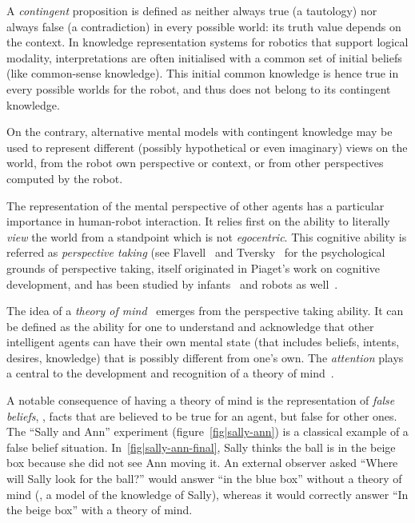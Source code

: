 A \emph{contingent} proposition is defined as neither always true (a tautology)
nor always false (a contradiction) in every possible world: its truth value
depends on the context. In knowledge representation systems for robotics that
support logical modality, interpretations are often initialised with a common
set of initial beliefs (like common-sense knowledge). This initial common
knowledge is hence true in every possible worlds for the robot, and thus does
not belong to its contingent knowledge.

On the contrary, alternative mental models with contingent knowledge may be
used to represent different (possibly hypothetical or even imaginary) views on
the world, from the robot own perspective or context, or from other
perspectives computed by the robot.

The representation of the mental perspective of other agents has a particular
importance in human-robot interaction. It relies first on the ability to
literally \emph{view} the world from a standpoint which is not
\emph{egocentric}. This cognitive ability is referred as \emph{perspective
taking} (see Flavell~\cite{Flavell1992} and Tversky~\cite{Tversky1999} for the
psychological grounds of perspective taking, itself originated in Piaget's work
on cognitive development, and has been studied by infants~\cite{Moll2006} and
robots as well~\cite{Trafton2005, Breazeal2006, Ros2010}.

The idea of a \emph{theory of mind}~\cite{Premack1978} emerges from the
perspective taking ability. It can be defined as the ability for one to
understand and acknowledge that other intelligent agents can have their own
mental state (that includes beliefs, intents, desires, knowledge) that is
possibly different from one's own. The \emph{attention} plays a central to the
development and recognition of a theory of mind~\cite{Baron-Cohen1985,
Leslie2000}.

A notable consequence of having a theory of mind is the representation of
\emph{false beliefs}, \ie, facts that are believed to be true for an agent, but
false for other ones. The ``Sally and Ann'' experiment
(figure~\ref{fig|sally-ann}) is a classical example of a false belief
situation. In~\ref{fig|sally-ann-final}, Sally thinks the ball is in the beige
box because she did not see Ann moving it. An external observer asked ``Where
will Sally look for the ball?'' would answer ``in the blue box'' without a
theory of mind (\ie, a model of the knowledge of Sally), whereas it would
correctly answer ``In the beige box'' with a theory of mind.

